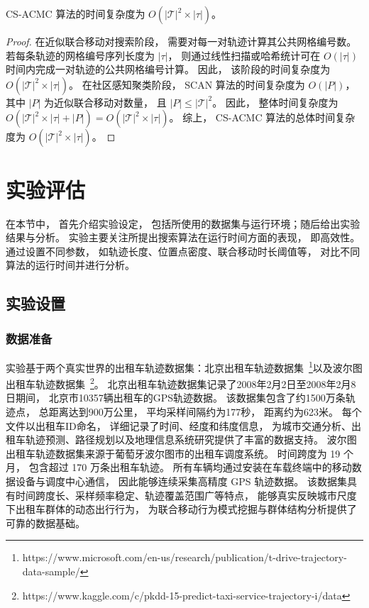 \begin{theorem}
CS-ACMC 算法的时间复杂度为 $O(|\mathcal{T}|^2 \times |\tau|)$。
\end{theorem}

\begin{proof}
在近似联合移动对搜索阶段， 需要对每一对轨迹计算其公共网格编号数。 若每条轨迹的网格编号序列长度为 $|\tau|$， 则通过线性扫描或哈希统计可在 $O(|\tau|)$ 时间内完成一对轨迹的公共网格编号计算。 因此， 该阶段的时间复杂度为
$
O(|\mathcal{T}|^2 \times |\tau|)
$。 在社区感知聚类阶段， SCAN 算法的时间复杂度为 $O(|P|)$， 其中 $|P|$ 为近似联合移动对数量， 且 $|P|\leq |\mathcal{T}|^2$。 因此， 整体时间复杂度为
$
O(|\mathcal{T}|^2 \times |\tau| + |P|)=O(|\mathcal{T}|^2 \times |\tau|)
$。 综上， CS-ACMC 算法的总体时间复杂度为 $O(|\mathcal{T}|^2 \times |\tau|)$。
\end{proof}

\section{实验评估}
\label{cm_sec:exp}
在本节中， 首先介绍实验设定， 包括所使用的数据集与运行环境；随后给出实验结果与分析。 实验主要关注所提出搜索算法在运行时间方面的表现， 即高效性。 通过设置不同参数， 如轨迹长度、位置点密度、联合移动时长阈值等， 对比不同算法的运行时间并进行分析。

\subsection{实验设置}

\subsubsection*{数据准备}
实验基于两个真实世界的出租车轨迹数据集：北京出租车轨迹数据集~\footnote{https://www.microsoft.com/en-us/research/publication/t-drive-trajectory-data-sample/}以及波尔图出租车轨迹数据集~\footnote{https://www.kaggle.com/c/pkdd-15-predict-taxi-service-trajectory-i/data}。 北京出租车轨迹数据集记录了2008年2月2日至2008年2月8日期间， 北京市10357辆出租车的GPS轨迹数据。 该数据集包含了约1500万条轨迹点， 总距离达到900万公里， 平均采样间隔约为177秒， 距离约为623米。 每个文件以出租车ID命名， 详细记录了时间、经度和纬度信息， 为城市交通分析、出租车轨迹预测、路径规划以及地理信息系统研究提供了丰富的数据支持。 波尔图出租车轨迹数据集来源于葡萄牙波尔图市的出租车调度系统。 时间跨度为 19 个月， 包含超过 170 万条出租车轨迹。 所有车辆均通过安装在车载终端中的移动数据设备与调度中心通信， 因此能够连续采集高精度 GPS 轨迹数据。 该数据集具有时间跨度长、采样频率稳定、轨迹覆盖范围广等特点， 能够真实反映城市尺度下出租车群体的动态出行行为， 为联合移动行为模式挖掘与群体结构分析提供了可靠的数据基础。

